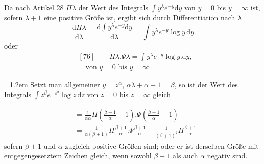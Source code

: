 Da nach Artikel 28 $\Pi\lambda$ der Wert des Integrals $\int y^\lambda e^{-y}\mathrm{d}y$ von $y=0$ bis $y=\infty$ ist, sofern $\lambda+1$ eine positive Größe ist, ergibt sich durch Differentiation nach $\lambda$
\[
\frac{\mathrm{d}\Pi\lambda}{\mathrm{d}\lambda}
=\frac{\mathrm{d}\int y^\lambda e^{-y}\mathrm{d}y}{\mathrm{d}\lambda}
=\int y^\lambda e^{-y}\log y\,\mathrm{d}y
\]
oder
\[
\begin{aligned}
&[76]\qquad \Pi\lambda.\Psi\lambda=\int y^\lambda e^{-y}\log y.\mathrm{d}y,\\[4pt]
&\quad\text{von }y=0\text{ bis }y=\infty
\end{aligned}
\]
\par{}
{\raggedright\parindent=1.2em Setzt man allgemeiner $y=z^\alpha$, $\alpha\lambda+\alpha-1=\beta$, so ist der Wert des Integrals $\int z^\beta e^{-z^\alpha}\log z\,\mathrm{d}z$ von $z=0$ bis $z=\infty$ gleich\par}
\[
\begin{aligned}
&=\frac{1}{\alpha\alpha}\Pi\left(\frac{\beta+1}{\alpha}-1\right).\Psi\left(\frac{\beta+1}{\alpha}-1\right)
\\[4pt]
&=\frac{1}{\alpha(\beta+1)}\Pi\frac{\beta+1}{\alpha}.\Psi\frac{\beta+1}{\alpha}
-\frac{1}{(\beta+1)^2}\Pi\frac{\beta+1}{\alpha}
\end{aligned}
\]
sofern $\beta+1$ und $\alpha$ zugleich positive Größen sind; oder er ist derselben Größe mit entgegengesetztem Zeichen gleich, wenn sowohl $\beta+1$ als auch $\alpha$ negativ sind.

